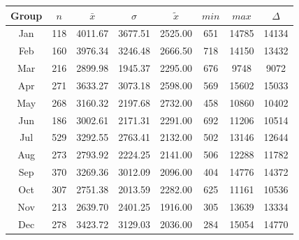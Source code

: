 \begin{figure}[ht!]
	\centering
	\begin{minipage}{0.5\textwidth}
		\tiny
		\setlength{\tabcolsep}{4pt}
		\centering
		\begin{tabular}{c|c|c|c|c|c|c|c}
			\toprule
			Group & $n$ & $\bar{x}$ & $\sigma$ & $\tilde{x}$ & $min$ & $max$ & $\Delta$ \\
			\midrule
			Jan & 118 & 4011.67 & 3677.51 & 2525.00 & 651 & 14785 & 14134 \\
			Feb & 160 & 3976.34 & 3246.48 & 2666.50 & 718 & 14150 & 13432 \\
			Mar & 216 & 2899.98 & 1945.37 & 2295.00 & 676 & 9748  & 9072  \\
			Apr & 271 & 3633.27 & 3073.18 & 2598.00 & 569 & 15602 & 15033 \\
			May & 268 & 3160.32 & 2197.68 & 2732.00 & 458 & 10860 & 10402 \\
			Jun & 186 & 3002.61 & 2171.31 & 2291.00 & 692 & 11206 & 10514 \\
			Jul & 529 & 3292.55 & 2763.41 & 2132.00 & 502 & 13146 & 12644 \\
			Aug & 273 & 2793.92 & 2224.25 & 2141.00 & 506 & 12288 & 11782 \\
			Sep & 370 & 3269.36 & 3012.09 & 2096.00 & 404 & 14776 & 14372 \\
			Oct & 307 & 2751.38 & 2013.59 & 2282.00 & 625 & 11161 & 10536 \\
			Nov & 213 & 2639.70 & 2401.25 & 1916.00 & 305 & 13639 & 13334 \\
			Dec & 278 & 3423.72 & 3129.03 & 2036.00 & 284 & 15054 & 14770 \\
			\bottomrule
		\end{tabular}
		\label{tbl:descriptives_arbis_matched_Month_SAvg}
	\end{minipage}%
	\begin{minipage}{0.55\textwidth}
\end{minipage}
\end{figure}
